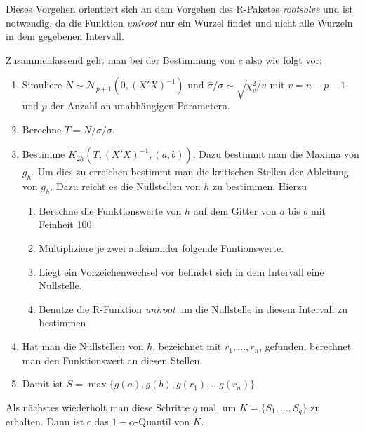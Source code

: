 \documentclass[12pt,a4paper]{article}
\theoremstyle{definition}
\theoremstyle{definition}
\theoremstyle{definition}
\theoremstyle{definition}
\newcommand{\ngridpoly}{100}
\begin{document}
Dieses Vorgehen orientiert sich an dem Vorgehen des R-Paketes \textit{rootsolve} und ist notwendig, da die Funktion \textit{uniroot} nur ein Wurzel findet und nicht alle Wurzeln in dem gegebenen Intervall.

Zusammenfassend geht man bei der Bestimmung von $c$ also wie folgt vor:

\begin{enumerate}
\item Simuliere $N \sim \mathscr{N}_{p+1}(0,(X'X)^{-1})$ und $\hat{\sigma}/\sigma \sim \sqrt{\chi^2_v /v}$ mit $v=n-p-1$ und $p$ der Anzahl an unabhängigen Parametern.
\item Berechne $T=N/\hat{\sigma}/\sigma$.
\item Bestimme $K_{2h}(T,(X'X)^{-1},(a,b))$. Dazu bestimmt man die Maxima von $g_h$. Um dies zu erreichen bestimmt man die kritischen Stellen der Ableitung von $g_h$. Dazu reicht es die Nullstellen von $h$ zu bestimmen. Hierzu
\begin{enumerate}
\item Berechne die Funktionswerte von $h$ auf dem Gitter von $a$ bis $b$ mit Feinheit \ngridpoly .
\item Multipliziere je zwei aufeinander folgende Funtionswerte.
\item Liegt ein Vorzeichenwechsel vor befindet sich in dem Intervall eine Nullstelle.
\item Benutze die R-Funktion \textit{uniroot} um die Nullstelle in diesem Intervall zu bestimmen
\end{enumerate}
\item Hat man die Nullstellen von $h$, bezeichnet mit $r_1, \ldots, r_n$, gefunden, berechnet man den Funktionswert an diesen Stellen.
\item Damit ist $S = \max\{ g(a), g(b), g(r_1), \ldots g(r_n) \}$
\end{enumerate}

Als nächstes wiederholt man diese Schritte $q$ mal, um $K= \{S_1, \ldots, S_q\}$ zu erhalten. Dann ist $c$ das $1-\alpha$-Quantil von $K$.
\end{document}

